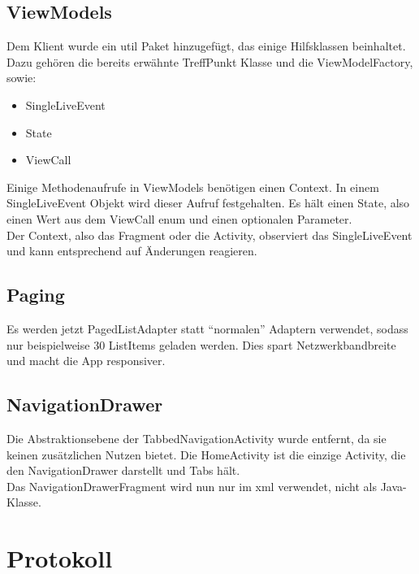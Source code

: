 \documentclass[parskip=full,11pt]{scrartcl}
\begin{document}
\subsection{ViewModels}
Dem Klient wurde ein util Paket hinzugefügt, das einige Hilfsklassen beinhaltet.\\
Dazu gehören die bereits erwähnte TreffPunkt Klasse und die
ViewModelFactory, sowie:
\begin{itemize}
\item
SingleLiveEvent

\item
State

\item
ViewCall

\end{itemize} 
Einige Methodenaufrufe in ViewModels benötigen einen Context. In einem
SingleLiveEvent Objekt wird dieser Aufruf festgehalten. Es hält einen State,
also einen Wert aus dem ViewCall enum und einen optionalen Parameter.\\
Der Context, also das Fragment oder die Activity, observiert das SingleLiveEvent und
kann entsprechend auf Änderungen reagieren.


\subsection{Paging}
Es werden jetzt PagedListAdapter statt \enquote{normalen} Adaptern verwendet,
sodass nur beispielweise 30 ListItems geladen werden. Dies spart Netzwerkbandbreite
und macht die App responsiver.

\subsection{NavigationDrawer}
Die Abstraktionsebene der TabbedNavigationActivity wurde entfernt, da
sie keinen zusätzlichen Nutzen bietet. Die HomeActivity ist die einzige
Activity, die den NavigationDrawer darstellt und Tabs hält.\\
Das NavigationDrawerFragment wird nun nur im xml verwendet, nicht als Java-Klasse.


\pagebreak
\section{Protokoll}
\end{document}
